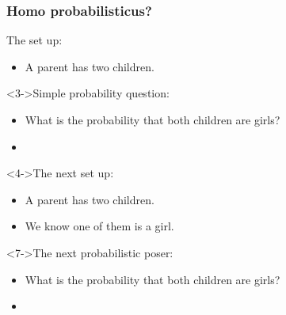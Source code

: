 \begin{frame}
\frametitle{Homo probabilisticus?}

\begin{block}{The set up:}
  \begin{itemize}
  \item<2->
    A parent has two children.
  \end{itemize}
\end{block}

\begin{block}<3->{Simple probability question:}
  \begin{itemize}
  \item<3->
    What is the probability that both
    children are girls?
  \item<8-| handout:0| trans:0>
  \end{itemize}
\end{block}

\begin{block}<4->{The next set up:}
  \begin{itemize}
  \item<5->
    A parent has two children.
  \item<6->
    We know one of them is a girl.
  \end{itemize}
\end{block}

\begin{block}<7->{The next probabilistic poser:}
  \begin{itemize}
  \item<7->
    What is the probability that both
    children are girls?
  \item<9-| handout:0| trans:0>
  \end{itemize}
\end{block}
\end{frame}


